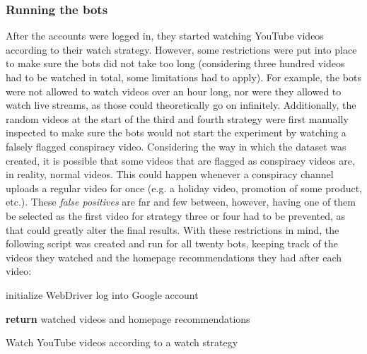 \documentclass[../main.tex]{subfiles}
\begin{document}
\subsubsection{Running the bots}
After the accounts were logged in, they started watching YouTube videos according to their watch
strategy. However, some restrictions were put into place to make sure the bots did not take too long
(considering three hundred videos had to be watched in total, some limitations had to apply). For
example, the bots were not allowed to watch videos over an hour long, nor were they allowed to watch live
streams, as those could theoretically go on infinitely. Additionally, the random videos at the start of
the third and fourth strategy were first manually inspected to make sure the bots would not start the
experiment by watching a falsely flagged conspiracy video. Considering the way in which the dataset was
created, it is possible that some videos that are flagged as conspiracy videos are, in reality, normal 
videos. This could happen whenever a conspiracy channel uploads a regular video for once (e.g. a holiday 
video, promotion of some product, etc.). These \textit{false positives} are far and few between, however,
having one of them be selected as the first video for strategy three or four had to be prevented, as that
could greatly alter the final results. With these restrictions in mind, the following script was created
and run for all twenty bots, keeping track of the videos they watched and the homepage recommendations they had after each video:

\vspace{0.25in}

\nolinenumbers

\begin{algorithm}[H]
 
 \vspace{0.075in}
 initialize WebDriver\;
 log into Google account\;

 \vspace{0.05in}
 \textbf{return} watched videos and homepage recommendations\;
 \caption{Watch YouTube videos according to a watch strategy}
\end{algorithm}
\end{document}
